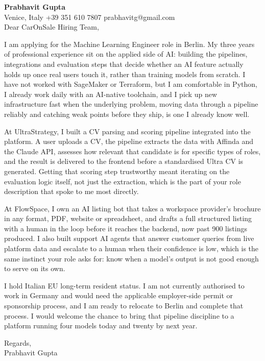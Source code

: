 \documentclass[a4paper,10.5pt]{article}
\begin{document}
\textbf{Prabhavit Gupta}\\
Venice, Italy \textbar{} +39 351 610 7807 \textbar{} prabhavitg@gmail.com\\[10pt]
Dear CarOnSale Hiring Team,

I am applying for the Machine Learning Engineer role in Berlin. My three years of professional experience sit on the applied side of AI: building the pipelines, integrations and evaluation steps that decide whether an AI feature actually holds up once real users touch it, rather than training models from scratch. I have not worked with SageMaker or Terraform, but I am comfortable in Python, I already work daily with an AI-native toolchain, and I pick up new infrastructure fast when the underlying problem, moving data through a pipeline reliably and catching weak points before they ship, is one I already know well.

At UltraStrategy, I built a CV parsing and scoring pipeline integrated into the platform. A user uploads a CV, the pipeline extracts the data with Affinda and the Claude API, assesses how relevant that candidate is for specific types of roles, and the result is delivered to the frontend before a standardised Ultra CV is generated. Getting that scoring step trustworthy meant iterating on the evaluation logic itself, not just the extraction, which is the part of your role description that spoke to me most directly.

At FlowSpace, I own an AI listing bot that takes a workspace provider's brochure in any format, PDF, website or spreadsheet, and drafts a full structured listing with a human in the loop before it reaches the backend, now past 900 listings produced. I also built support AI agents that answer customer queries from live platform data and escalate to a human when their confidence is low, which is the same instinct your role asks for: know when a model's output is not good enough to serve on its own.

I hold Italian EU long-term resident status. I am not currently authorised to work in Germany and would need the applicable employer-side permit or sponsorship process, and I am ready to relocate to Berlin and complete that process. I would welcome the chance to bring that pipeline discipline to a platform running four models today and twenty by next year.

Regards,\\
Prabhavit Gupta
\end{document}
